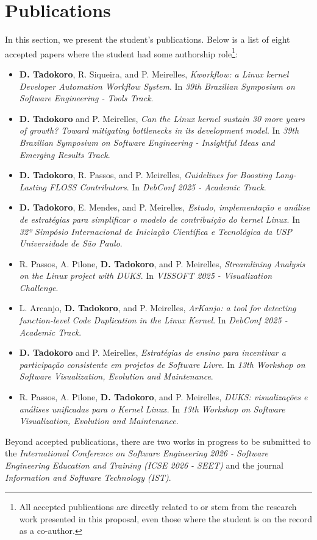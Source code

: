 \section{Publications}
\label{sec:publications}

In this section, we present the student's publications. Below is a list of eight accepted papers where the student had some authorship role\footnote{All accepted publications are directly related to or stem from the research work presented in this proposal, even those where the student is on the record as a co-author.}:

{\footnotesize
\begin{itemize}
    \item \textbf{D. Tadokoro}, R. Siqueira, and P. Meirelles, \textit{Kworkflow: a Linux kernel Developer Automation Workflow System}. In \textit{39th Brazilian Symposium on Software Engineering - Tools Track}.
    \item \textbf{D. Tadokoro} and P. Meirelles, \textit{Can the Linux kernel sustain 30 more years of growth? Toward mitigating bottlenecks in its development model}. In \textit{39th Brazilian Symposium on Software Engineering - Insightful Ideas and Emerging Results Track}.
    \item \textbf{D. Tadokoro}, R. Passos, and P. Meirelles, \textit{Guidelines for Boosting Long-Lasting FLOSS Contributors}. In \textit{DebConf 2025 - Academic Track}.
    \item \textbf{D. Tadokoro}, E. Mendes, and P. Meirelles, \textit{Estudo, implementação e análise de estratégias para simplificar o modelo de contribuição do kernel Linux}. In \textit{32º Simpósio Internacional de Iniciação Científica e Tecnológica da USP Universidade de São Paulo}.
    \item R. Passos, A. Pilone, \textbf{D. Tadokoro}, and P. Meirelles, \textit{Streamlining Analysis on the Linux project with DUKS}. In \textit{VISSOFT 2025 - Visualization Challenge}.
    \item L. Arcanjo, \textbf{D. Tadokoro}, and P. Meirelles, \textit{ArKanjo: a tool for detecting function-level Code Duplication in the Linux Kernel}. In \textit{DebConf 2025 - Academic Track}.
    \item \textbf{D. Tadokoro} and P. Meirelles, \textit{Estratégias de ensino para incentivar a participação consistente em projetos de Software Livre}. In \textit{13th Workshop on Software Visualization, Evolution and Maintenance}.
    \item R. Passos, A. Pilone, \textbf{D. Tadokoro}, and P. Meirelles, \textit{DUKS: visualizações e análises unificadas para o Kernel Linux}. In \textit{13th Workshop on Software Visualization, Evolution and Maintenance}.
\end{itemize}
}
Beyond accepted publications, there are two works in progress to be submitted to the \textit{International Conference on Software Engineering 2026 - Software Engineering Education and Training (ICSE 2026 - SEET)} and the journal \textit{Information and Software Technology (IST)}.
